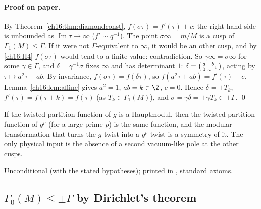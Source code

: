 \paragraph{Proof on paper.}  By Theorem~\ref{ch16:thm:diamondconst}, $f(\sigma\tau)=f'(\tau)+c$; the right-hand side is
unbounded as $\operatorname{Im}\tau\to\infty$ ($f'\sim q^{-1}$).  The point $\sigma\infty=m/M$ is a cusp of
$\Gamma_1(M)\le\Gamma$.  If it were not $\Gamma$-equivalent to $\infty$, it would be an other cusp, and by \ref{ch16:H4}
$f(\sigma\tau)$ would tend to a finite value: contradiction.  So $\gamma\infty=\sigma\infty$ for some $\gamma\in\Gamma$,
and $\delta=\gamma^{-1}\sigma$ fixes $\infty$ and has determinant $1$: $\delta=\left(\begin{smallmatrix}a&b\\0&a^{-1}\end{smallmatrix}\right)$, acting by
$\tau\mapsto a^2\tau+ab$.  By invariance, $f(\sigma\tau)=f(\delta\tau)$, so $f(a^2\tau+ab)=f'(\tau)+c$.
Lemma~\ref{ch16:lem:affine} gives $a^2=1$, $ab=k\in\Z$, $c=0$.  Hence $\delta=\pm T_k$, $f'(\tau)=f(\tau+k)=f(\tau)$ (as
$T_k\in\Gamma_1(M)$), and $\sigma=\gamma\delta=\pm\gamma T_k\in\pm\Gamma$. \qed
\begin{physics}
If the twisted partition function of $g$ is a Hauptmodul, then the twisted partition function of $g^p$ (for a large
prime $p$) is the same function, and the modular transformation that turns the $g$-twist into a $g^p$-twist is a
symmetry of it.  The only physical input is the absence of a second vacuum-like pole at the other cusps.
\end{physics}
\begin{status}
Unconditional (with the stated hypotheses); printed in ,
standard axioms.
\end{status}

\subsection{\texorpdfstring{$\Gamma_0(M)\le\pm\Gamma$}{Gamma0(M) in ±Gamma} by Dirichlet's theorem}

